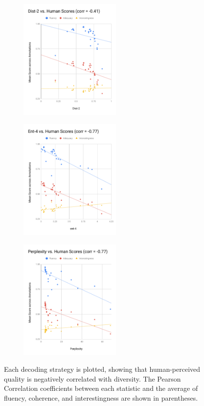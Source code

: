 \begin{figure}[ht]
    \centering
    \begin{subfigure}[l]{5cm}
        \includegraphics[width=5cm]{figures/dist2_vs_human.pdf}
    \end{subfigure}
    \begin{subfigure}[l]{5cm}
        \includegraphics[width=5cm]{figures/ent4_vs_human.pdf}
    \end{subfigure}
    \begin{subfigure}[l]{5cm}
        \includegraphics[width=5cm]{figures/perplexity_vs_human.pdf}
    \end{subfigure}
    \caption{Each decoding strategy is plotted, showing that human-perceived quality is negatively correlated with diversity. The Pearson Correlation coefficients between each statistic and the average of fluency, coherence, and interestingness are shown in parentheses.}
    \label{fig:correlations}
\end{figure}

